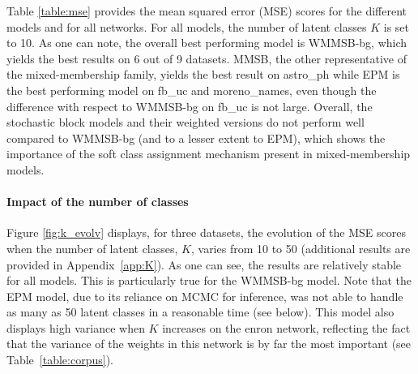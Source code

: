 Table \ref{table:mse} provides the mean squared error (MSE) scores for the different models and for all networks. For all models, the number of latent classes $K$ is set to 10.
As one can note, the overall best performing model is WMMSB-bg, which yields the best results on 6 out of 9 datasets. MMSB, the other representative of the mixed-membership family, yields the best result on astro\_ph while EPM is the best performing model on fb\_uc and moreno\_names, even though the difference with respect to WMMSB-bg on fb\_uc is not large. Overall, the stochastic block models and their weighted versions do not perform well compared to WMMSB-bg (and to a lesser extent to EPM), which shows the importance of the soft class assignment mechanism present in mixed-membership models. 


\paragraph{Impact of the number of classes} Figure \ref{fig:k_evolv} displays, for three datasets, the evolution of the MSE scores when the number of latent classes, $K$, varies from 10 to 50  (additional results are provided in Appendix~\ref{app:K}). As one can see, the results are relatively stable for all models. This is particularly true for the WMMSB-bg model. Note that the EPM model, due to its reliance on MCMC for inference, was not able to handle as many as 50 latent classes in a reasonable time (see below). This model also displays high variance when $K$ increases on the enron network, reflecting the fact that the variance of the weights in this network is by far the most important (see Table~\ref{table:corpus}).

